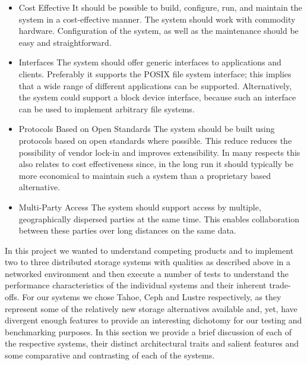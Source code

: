 \documentclass[11pt]{article}
\begin{document}
\begin{itemize}
\item Cost Effective It should be possible to build, configure, run, and 
maintain the system in a cost-effective manner. The system should work with 
commodity hardware. Configuration of the system, as well as the maintenance 
should be easy and straightforward. 

\item Interfaces The system should offer generic interfaces to applications 
and clients. Preferably it supports the POSIX file system interface; this 
implies that a wide range of different applications can be supported.  
Alternatively, the system could support a block device interface, because 
such an interface can be used to implement arbitrary file systems.

\item Protocols Based on Open Standards The system should be built using 
protocols based on open standards where possible. This reduce reduces the 
possibility of vendor lock-in and improves extensibility. In many respects 
this also relates to cost effectiveness since, in the long run it should 
typically be more economical to maintain such a system than a proprietary 
based alternative.

\item Multi-Party Access The system should support access by multiple, 
geographically dispersed parties at the same time. This enables 
collaboration between these parties over long distances on the same data.

\end{itemize}

In this project we wanted to understand competing products and to 
implement two to three distributed storage systems with qualities as 
described above in a networked environment and then execute a number of 
tests to understand the performance characteristics of the individual 
systems and their inherent trade-offs. For our systems we chose Tahoe, 
Ceph and Lustre respectively, as they represent some of the relatively 
new storage alternatives available and, yet, have divergent enough 
features to provide an interesting dichotomy for our testing and 
benchmarking purposes. In this section we provide a brief discussion 
of each of the respective systems, their distinct architectural traits 
and salient features and some comparative and contrasting of each of 
the systems.  
\end{document}

